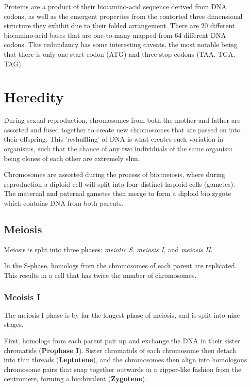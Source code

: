 Proteins are a product of their \gls{bio:amino-acid} sequence derived from DNA codons, as well as the emergent properties from the contorted three dimensional structure they exhibit due to their folded arrangement.  There are 20 different \gls{bio:amino-acid} bases that are one-to-many mapped from 64 different DNA codons. This redundancy has some interesting caveats, the most notable being that there is only one start codon (ATG) and three stop codons (TAA, TGA, TAG).

\section{Heredity}

During sexual reproduction, chromosomes from both the mother and father are assorted and fused together to create new chromosomes that are passed on into their offspring. This 'reshuffling' of DNA is what creates such variation in organisms, such that the chance of any two individuals of the same organism being clones of each other are extremely slim.

Chromosomes are assorted during the process of \gls{bio:meiosis}, where during reproduction a diploid cell will split into four distinct haploid cells (gametes). The maternal and paternal gametes then merge to form a diploid \gls{bio:zygote} which contains DNA from both parents.


\subsection{Meiosis}

Meiosis is split into three phases: \textit{meiotic S}, \textit{meiosis I}, and \textit{meiosis II}. 

In the S-phase, homologs from the chromosomes of each parent are replicated. This results in a cell that has twice the number of chromosomes.

\subsubsection{Meoisis I}

The meiosis I phase is by far the longest phase of meiosis, and is split into nine stages. 

First, homologs from each parent pair up and exchange the DNA in their sister chromatids (\textbf{Prophase I}).  Sister chromatids of each chromosome then detach into thin threads (\textbf{Leptotene}), and the chromosomes then align into homologous chromosome pairs that snap together outwards in a zipper-like fashion from the centromere, forming a \gls{bio:bivalent} (\textbf{Zygotene}). 

